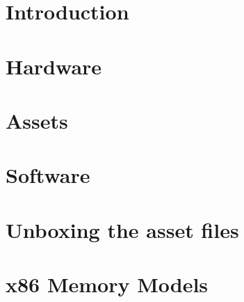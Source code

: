 \documentclass[8pt]{book}
\begin{document}
         

    \renewcommand{\rmdefault}{cmss} 
    \renewcommand{\familydefault}{\sfdefault}
    

    
    
    \cleardoublepage %
  

    \cleardoublepage %

    \setcounter{secnumdepth}{3} %
    
    
    
    
    \tableofcontents
    
    \pagebreak

	\chapter{Introduction}
      
    
  
    \chapter{Hardware}
      
      
    \chapter{Assets}
      
      
    \chapter{Software}
       
       
       
       
       
       
       
       
    \appendix
    \appendixpage

	\chapter{Unboxing the asset files}
   		    
    
    \chapter{x86 Memory Models}
   		
\end{document}
